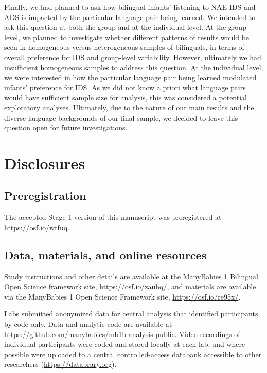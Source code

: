 \documentclass[
  english,
  ,man,floatsintext]{apa6}
\begin{document}
\begin{enumerate}
  Finally, we had planned to ask how bilingual infants' listening to NAE-IDS and ADS is impacted by the particular language pair being learned. We intended to ask this question at both the group and at the individual level. At the group level, we planned to investigate whether different patterns of results would be seen in homogeneous versus heterogeneous samples of bilinguals, in terms of overall preference for IDS and group-level variability. However, ultimately we had insufficient homogeneous samples to address this question. At the individual level, we were interested in how the particular language pair being learned modulated infants' preference for IDS. As we did not know a priori what language pairs would have sufficient sample size for analysis, this was considered a potential exploratory analyses. Ultimately, due to the nature of our main results and the diverse language backgrounds of our final sample, we decided to leave this question open for future investigations.
\end{enumerate}

\hypertarget{disclosures}{%
\section{Disclosures}\label{disclosures}}

\hypertarget{preregistration}{%
\subsection{Preregistration}\label{preregistration}}

The accepted Stage 1 version of this manuscript was preregistered at \url{https://osf.io/wtfuq}.

\hypertarget{data-materials-and-online-resources}{%
\subsection{Data, materials, and online resources}\label{data-materials-and-online-resources}}

Study instructions and other details are available at the ManyBabies 1 Bilingual Open Science framework site, \url{https://osf.io/zauhq/}, and materials are available via the ManyBabies 1 Open Science Framework site, \url{https://osf.io/re95x/}.

Labs submitted anonymized data for central analysis that identified participants by code only. Data and analytic code are available at \url{https://github.com/manybabies/mb1b-analysis-public}. Video recordings of individual participants were coded and stored locally at each lab, and where possible were uploaded to a central controlled-access databank accessible to other researchers (\url{https://databrary.org}).
\end{document}
